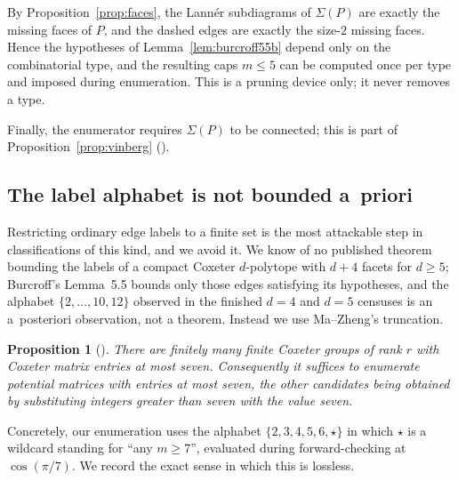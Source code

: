 \documentclass[11pt,reqno]{amsart}
\theoremstyle{plain}
\newtheorem{proposition}[theorem]{Proposition}
\theoremstyle{definition}
\begin{document}
By Proposition~\ref{prop:faces}, the Lann\'er subdiagrams of $\Sigma(P)$ are
exactly the missing faces of $P$, and the dashed edges are exactly the
size-$2$ missing faces. Hence the hypotheses of Lemma~\ref{lem:burcroff55b}
depend only on the combinatorial type, and the resulting caps $m\le 5$ can be
computed once per type and imposed during enumeration. This is a pruning device only; it
never removes a type.

Finally, the enumerator requires $\Sigma(P)$ to be connected; this is part of
Proposition~\ref{prop:vinberg} (\cite[Remark~4.3]{Burcroff2024}).

\subsection{The label alphabet is not bounded a~priori}
\label{sec:alphabet}

Restricting ordinary edge labels to a finite set is the most attackable step in
classifications of this kind, and we avoid it. We know of no published theorem
bounding the labels of a compact Coxeter $d$-polytope with $d+4$ facets for
$d\ge5$; Burcroff's Lemma~5.5 bounds only those edges satisfying its
hypotheses, and the alphabet $\{2,\dots,10,12\}$ observed in the finished
$d=4$ and $d=5$ censuses is an a~posteriori observation, not a theorem.
Instead we use Ma--Zheng's truncation.

\begin{proposition}[{\cite[Prop.~3.5]{MaZheng2024}}]
\label{prop:mz35}
There are finitely many finite Coxeter groups of rank $r$ with Coxeter matrix
entries at most seven. Consequently it suffices to enumerate potential matrices
with entries at most seven, the other candidates being obtained by substituting
integers greater than seven with the value seven.
\end{proposition}

Concretely, our enumeration uses the alphabet $\{2,3,4,5,6,\star\}$ in which
$\star$ is a wildcard standing for ``any $m\ge7$'', evaluated during
forward-checking at $\cos(\pi/7)$. We record the exact sense in which this is
lossless.
\end{document}

